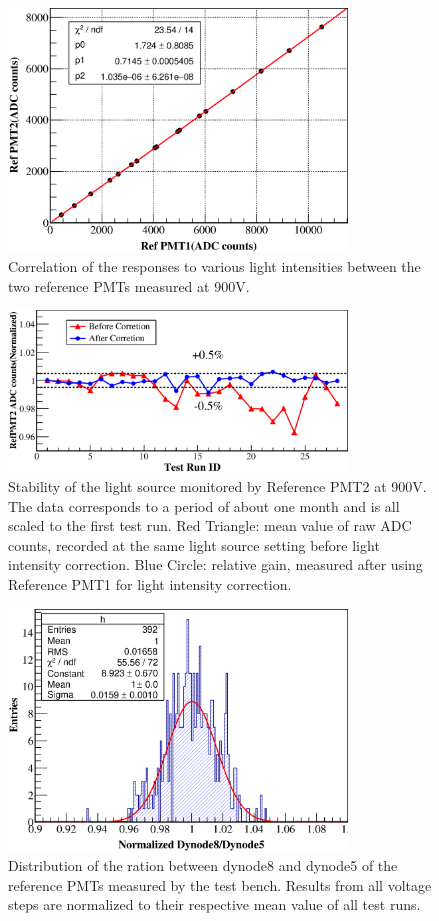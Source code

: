 \documentclass[5p, times]{elsarticle}
\begin{document}
\begin{figure}[h!]
 \centering
 \includegraphics[width=90mm]{RelativeGainRef}
\caption{Correlation of the responses to various light intensities between the two reference PMTs measured at 900V.}
\label{fig:refgain_relation}
\end{figure} 

\begin{figure}[H]
 \centering
 \includegraphics[width=90mm]{led_stability}
\caption{Stability of the light source monitored by Reference PMT2 at 900V.
The data corresponds to a period of about one month and is all scaled to the first test run.
Red Triangle: mean value of raw ADC counts, recorded at the same light source setting before light intensity correction.
Blue Circle: relative gain, measured after using Reference PMT1 for light intensity correction.}
\label{fig:led_stability}
\end{figure} 

\begin{figure}[H]
 \centering
 \includegraphics[width=90mm]{RefDy58Dist}
\caption{Distribution of the ration between dynode8 and dynode5 of the reference PMTs measured by the test bench.
Results from all voltage steps are normalized to their respective mean value of all test runs.}
\label{fig:dy58_stabiltiy}
\end{figure} 
\end{document}
